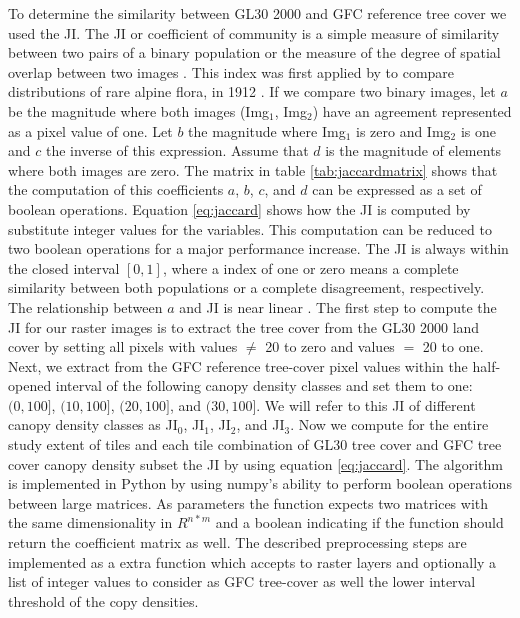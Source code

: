 			To determine the similarity between \ac{GL30} 2000 and \ac{GFC} reference tree cover we used the \ac{JI}. The \ac{JI} or coefficient of community is a simple measure of similarity between two pairs of a binary population or the measure of the degree of spatial overlap between two images \citep{Sampat2009}. This index was first applied by \citeauthor{Jaccard1912} to compare distributions of rare alpine flora, in 1912 \citep{Jaccard1912}. If we compare two binary images, let $a$ be the magnitude where both images (Img$_1$, Img$_2$) have an agreement represented as a pixel value of one. Let $b$ the magnitude where Img$_1$ is zero and Img$_2$ is one and $c$ the inverse of this expression. Assume that $d$ is the magnitude of elements where both images are zero. The matrix in table \ref{tab:jaccardmatrix} shows that the computation of this coefficients $a$, $b$, $c$, and $d$ can be expressed as a set of boolean operations. Equation \ref{eq:jaccard} shows how the \ac{JI} is computed by substitute integer values for the variables. This computation can be reduced to two boolean operations for a major performance increase. The \ac{JI} is always within the closed interval $[0,1]$, where a index of one or zero means a complete similarity between both populations or a complete disagreement, respectively. The relationship between $a$ and \ac{JI} is near linear \citep{Shi1993}. The first step to compute the \ac{JI} for our raster images is to extract the tree cover from the \ac{GL30} 2000 land cover by setting all pixels with values $\neq$ 20 to zero and values $=$ 20 to one. Next, we extract from the \ac{GFC} reference tree-cover pixel values within the half-opened interval of the following canopy density classes and set them to one: $(0,100]$, $(10,100]$, $(20,100]$, and $(30,100]$. We will refer to this \ac{JI} of different canopy density classes as JI$_0$, JI$_1$, JI$_2$, and JI$_3$. Now we compute for the entire study extent of  tiles and each tile combination of \ac{GL30} tree cover and \ac{GFC} tree cover canopy density subset the \ac{JI} by using equation \ref{eq:jaccard}. The algorithm is implemented in Python by using numpy's ability to perform boolean operations between large matrices. As parameters the function expects two matrices with the same dimensionality in $R^{n*m}$ and a boolean indicating if the function should return the coefficient matrix as well. The described preprocessing steps are implemented as a extra function which accepts to raster layers and optionally a list of integer values to consider as \ac{GFC} tree-cover as well the lower interval threshold of the copy densities.
